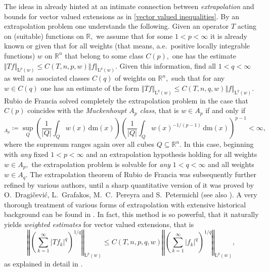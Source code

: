 \documentclass{article}
\theoremstyle{definition}
\theoremstyle{remark}
\numberwithin{equation}{section}
\newcommand{\mathdm}{\,\mathrm{dm}}
\newcommand{\reals}{\mathbb{R}}
\newcommand{\Lp}[1]{\mathrm{L}^{#1}}
\newcommand{\1}{\mathbf{1}}
\begin{document}
    The ideas in \cite{Rubio_de_Francia_1985} already hinted at an intimate connection between \emph{extrapolation} and bounds for vector valued extensions as in \eqref{vector valued inequalities}. By an extrapolation problem one understands the following. Given an operator $T$ acting on (suitable) functions on $\reals,$ we assume that for some $1<p<\infty$ it is already known or given that for all weights (that means, a.e.~positive locally integrable functions) $w$ on $\reals^n$ that belong to some class $C(p),$ one has the estimate $\Vert Tf\Vert_{\Lp{p}(w)}\leq C(T,n,p,w)\Vert f\Vert_{\Lp{p}(w)}.$ Given this information, find all $1<q<\infty$ as well as associated classes $C(q)$ of weights on $\reals^n,$ such that for any $w\in C(q)$ one has an estimate of the form $\Vert Tf\Vert_{\Lp{q}(w)}\leq C(T,n,q,w)\Vert f\Vert_{\Lp{q}(w)}.$ Rubio de Francia \cite{Rubio_de_Francia_1984} solved completely the extrapolation problem in the case that $C(p)$ coincides with the \emph{Muckenhoupt $A_p$ class}, that is $w\in A_p$ if and only if
    \begin{equation*}
        [w]_{A_p}\coloneq \sup_{Q}\left(\frac{1}{|Q|}\int_{Q}w(x)\mathdm(x)\right)\left(\frac{1}{|Q|}\int_{Q}w(x)^{-1/(p-1)}\mathdm(x)\right)^{p-1}<\infty,
    \end{equation*}
    where the supremum ranges again over all cubes $Q\subseteq\reals^n.$ In this case, beginning with \emph{any} fixed $1<p<\infty$ and an extrapolation hypothesis holding for all weights $w\in A_p,$ the extrapolation problem is solvable for \emph{any} $1<q<\infty$ and all weights $w\in A_q.$ The extrapolation theorem of Rubio de Francia was subsequently further refined by various authors, until a sharp quantitative version of it was proved by O.~Dragi{\v c}evi{\'c}, L.~Grafakos, M.~C.~Pereyra and S.~Petermichl \cite{Dragicevic2005} (see also \cite{Duoandikoetxea_2011}). A very thorough treatment of various forms of extrapolation with extensive historical background can be found in \cite{Book_Extrapolation}. In fact, this method is so powerful, that it naturally yields \emph{weighted estimates} for vector valued extensions, that is
    \begin{equation}
        \label{weighted vector valued inequalities}
        \left\Vert\left(\sum_{k=1}^{\infty}|Tf_k|^{q}\right)^{1/q}\right\Vert_{\Lp{p}(w)}\leq C(T,n,p,q,w)\left\Vert\left(\sum_{k=1}^{\infty}|f_k|^{q}\right)^{1/q}\right\Vert_{\Lp{p}(w)},
    \end{equation}
    as explained in detail in \cite{Book_Extrapolation}.
\end{document}
